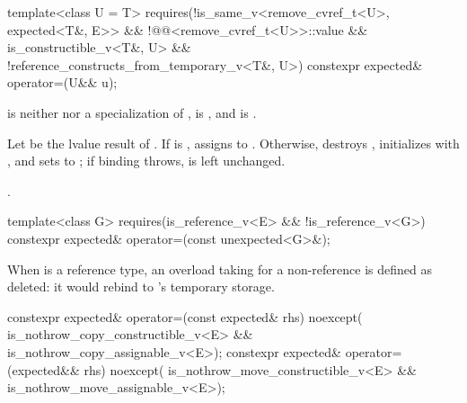 %
\begin{itemdecl}
template<class U = T>
  requires(!is_same_v<remove_cvref_t<U>, expected<T&, E>> &&
           !@@<remove_cvref_t<U>>::value &&
           is_constructible_v<T&, U> && !reference_constructs_from_temporary_v<T&, U>)
constexpr expected& operator=(U&& u);
\end{itemdecl}

\begin{itemdescr}
\pnum
\constraints
{} is neither  nor a specialization of ,  is , and  is .

\pnum
\effects
Let  be the lvalue result of . If  is , assigns  to . Otherwise, destroys , initializes  with , and sets  to ; if binding  throws,  is left unchanged.

\pnum
\returns
{}.
\end{itemdescr}

%
\begin{itemdecl}
template<class G>
  requires(is_reference_v<E> && !is_reference_v<G>)
constexpr expected& operator=(const unexpected<G>&);
\end{itemdecl}

\begin{itemdescr}
\pnum
\remarks
When  is a reference type, an overload taking  for a non-reference  is defined as deleted: it would rebind  to 's temporary storage.
\end{itemdescr}

%
\begin{itemdecl}
constexpr expected& operator=(const expected& rhs) noexcept(
    is_nothrow_copy_constructible_v<E> && is_nothrow_copy_assignable_v<E>);
constexpr expected& operator=(expected&& rhs) noexcept(
    is_nothrow_move_constructible_v<E> && is_nothrow_move_assignable_v<E>);
\end{itemdecl}

